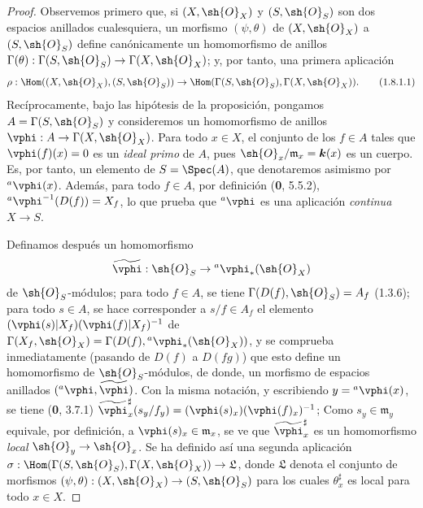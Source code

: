 \begin{proof}
Observemos primero que, si $(X,\sh{O}_X)$ y $(S,\sh{O}_S)$ son dos
espacios anillados cualesquiera, un morfismo $(\psi,\theta)$ de
$(X,\sh{O}_X)$ a $(S,\sh{O}_S)$ define canónicamente un homomorfismo
de anillos
$\Gamma(\theta):\Gamma(S,\sh{O}_S)\to\Gamma(X,\sh{O}_X)$;
y, por tanto, una primera aplicación
\begin{equation}
\label{ega2:addendum:I.1.8.1.1-fr}
  \rho:\Hom((X,\sh{O}_X),(S,\sh{O}_S))
  \to\Hom(\Gamma(S,\sh{O}_S),\Gamma(X,\sh{O}_X)).
\tag{1.8.1.1}
\end{equation}
Recíprocamente, bajo las hipótesis de la proposición, pongamos
$A=\Gamma(S,\sh{O}_S)$ y consideremos un homomorfismo de anillos
$\vphi:A\to\Gamma(X,\sh{O}_X)$. Para todo $x\in X$, el conjunto de
los $f\in A$ tales que $\vphi(f)(x)=0$ es un \emph{ideal primo} de $A$, pues
$\sh{O}_x/\mathfrak m_x=\boldsymbol{k}(x)$ es un cuerpo. Es, por tanto, un
elemento de $S=\Spec(A)$, que denotaremos asimismo por
${}^a\vphi(x)$. Además, para todo $f\in A$, por definición (\textbf 0, 5.5.2),
${}^a\vphi^{-1}(D(f))=X_f$,
lo que prueba que ${}^a\vphi$ es una aplicación \emph{continua} $X\to S$.

Definamos después un homomorfismo
\[
  \widetilde{\vphi}:\sh{O}_S\to{}^a\vphi_*(\sh{O}_X)
\] de $\sh{O}_S$-módulos; para todo $f\in A$, se tiene
$\Gamma(D(f),\sh{O}_S)=A_f$ (1.3.6); para todo $s\in A$, se hace corresponder a $s/f\in A_f$ el elemento
$(\vphi(s)|X_f)(\vphi(f)|X_f)^{-1}$ de $\Gamma(X_f,\sh{O}_X)=\Gamma(D(f),{}^a\vphi_*(\sh{O}_X))$,
y se comprueba inmediatamente (pasando de $D(f)$ a $D(fg)$) que esto define un homomorfismo de $\sh{O}_S$-módulos, de donde, un morfismo de espacios
anillados $({}^a\vphi,\widetilde{\vphi})$. Con la misma notación, y
escribiendo $y={}^a\vphi(x)$, se tiene (\textbf 0, 3.7.1)
$\widetilde{\vphi}_x^\sharp(s_y/f_y)=(\vphi(s)_x)(\vphi(f)_x)^{-1}$;
Como $s_y\in\mathfrak m_y$ equivale, por definición, a
$\vphi(s)_x\in\mathfrak m_x$, se ve que $\widetilde{\vphi}_x^\sharp$ es un homomorfismo \emph{local} $\sh{O}_y\to\sh{O}_x$. Se ha
definido así una segunda aplicación
$\sigma:\Hom(\Gamma(S,\sh{O}_S),\Gamma(X,\sh{O}_X))\to\mathfrak L$,
donde $\mathfrak L$ denota el conjunto de morfismos
$(\psi,\theta):(X,\sh{O}_X)\to(S,\sh{O}_S)$ para los cuales
$\theta_x^\sharp$ es local para todo $x\in X$.


\end{proof}
